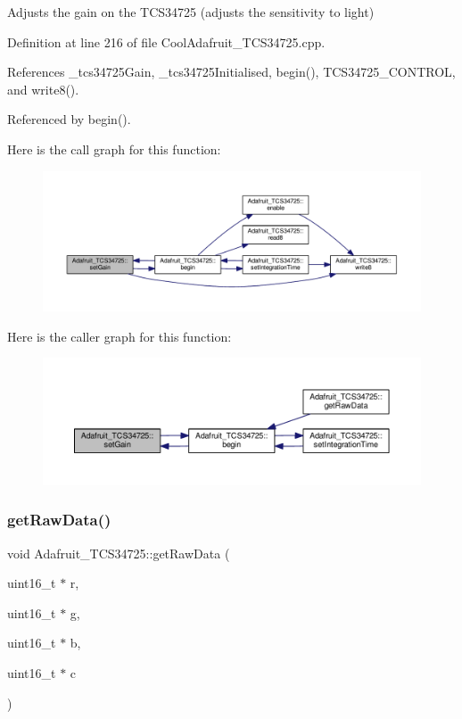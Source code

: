 Adjusts the gain on the T\+C\+S34725 (adjusts the sensitivity to light) 

Definition at line 216 of file Cool\+Adafruit\+\_\+\+T\+C\+S34725.\+cpp.



References \+\_\+tcs34725\+Gain, \+\_\+tcs34725\+Initialised, begin(), T\+C\+S34725\+\_\+\+C\+O\+N\+T\+R\+OL, and write8().



Referenced by begin().

Here is the call graph for this function\+:
\nopagebreak
\begin{figure}[H]
\begin{center}
\leavevmode
\includegraphics[width=350pt]{df/d54/class_adafruit___t_c_s34725_a6be06315a9d33f76e44550f574f023a5_cgraph}
\end{center}
\end{figure}
Here is the caller graph for this function\+:
\nopagebreak
\begin{figure}[H]
\begin{center}
\leavevmode
\includegraphics[width=350pt]{df/d54/class_adafruit___t_c_s34725_a6be06315a9d33f76e44550f574f023a5_icgraph}
\end{center}
\end{figure}
\mbox{\label{class_adafruit___t_c_s34725_abd9946a9baab1e0c76248cfe1864ea27}} 
\subsubsection{\texorpdfstring{get\+Raw\+Data()}{getRawData()}}
{\footnotesize\ttfamily void Adafruit\+\_\+\+T\+C\+S34725\+::get\+Raw\+Data (\begin{DoxyParamCaption}\item[{uint16\+\_\+t $\ast$}]{r,  }\item[{uint16\+\_\+t $\ast$}]{g,  }\item[{uint16\+\_\+t $\ast$}]{b,  }\item[{uint16\+\_\+t $\ast$}]{c }\end{DoxyParamCaption})}



